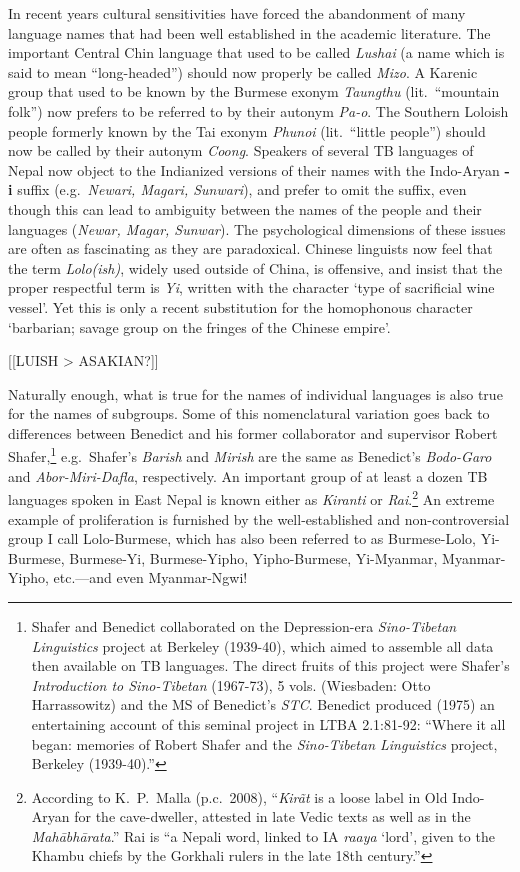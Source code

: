 In recent years cultural sensitivities have forced the abandonment of many
language names that had been well established in the academic literature.  The
important Central Chin language that used to be called \textit{Lushai} (a name which is
said to mean “long-headed”) should now properly be called \textit{Mizo}.
A Karenic group
that used to be known by the Burmese exonym \textit{Taungthu} (lit.\ “mountain folk”) now
prefers to be referred to by their autonym \textit{Pa-o}.  The Southern Loloish people
formerly known by the Tai exonym \textit{Phunoi} (lit.\ “little people”) should now be
called by their autonym \textit{Coong}.  Speakers of several TB languages of Nepal now
object to the Indianized versions of their names with the Indo-Aryan \textbf{-i} suffix
(e.g.\ \textit{Newari, Magari, Sunwari}), and prefer to omit the suffix, even though this
can lead to ambiguity between the names of the people and their languages
(\textit{Newar, Magar, Sunwar}).  The psychological dimensions of these issues are often
as fascinating as they are paradoxical.  Chinese linguists now feel that the
term \textit{Lolo(ish)}, widely used outside of China,
is offensive, and insist that the
proper respectful term is \textit{Yi}, written with the character  ‘type of
sacrificial wine vessel’.  Yet this is only a recent substitution for the
homophonous character  ‘barbarian; savage group on the fringes of the Chinese
empire’.



[[LUISH > ASAKIAN?]]


Naturally enough, what is true for the names of individual languages is also
true for the names of subgroups.  Some of this nomenclatural variation goes back
to differences between Benedict and his former collaborator and supervisor
Robert Shafer,\footnote{Shafer and Benedict collaborated on the Depression-era
\textit{Sino-Tibetan Linguistics} project at Berkeley (1939-40), which aimed to assemble
all data then available on TB languages.  The direct fruits of this project were
Shafer’s \textit{Introduction to Sino-Tibetan} (1967-73), 5 vols. (Wiesbaden: Otto
Harrassowitz) and the MS of Benedict’s \textit{STC}.  Benedict produced (1975) an
entertaining account of this seminal project in LTBA 2.1:81-92: “Where it all
began: memories of Robert Shafer and the \textit{Sino-Tibetan Linguistics} project,
Berkeley (1939-40).”} e.g.\ Shafer’s \textit{Barish} and \textit{Mirish} are the same as Benedict’s
\textit{Bodo-Garo} and \textit{Abor-Miri-Dafla}, respectively.  An important group of at least a
dozen TB languages spoken in East Nepal is known either as \textit{Kiranti} or
\textit{Rai}.\footnote{According to K.~P.~Malla (p.c.~2008), “\textit{Kirãt} is a loose label in Old Indo-Aryan for the cave-dweller, attested in late Vedic texts as well as in the \textit{Mahābhārata}.” Rai is “a Nepali word, linked to IA \textit{raaya} ‘lord’, given to the Khambu chiefs by the Gorkhali rulers in the late 18th century.”}
  An extreme example of proliferation is furnished by the well-established and
non-controversial group I call Lolo-Burmese, which has also been referred to as
Burmese-Lolo, Yi-Burmese, Burmese-Yi, Burmese-Yipho, Yipho-Burmese, Yi-Myanmar,
Myanmar-Yipho, etc.—and even Myanmar-Ngwi!

